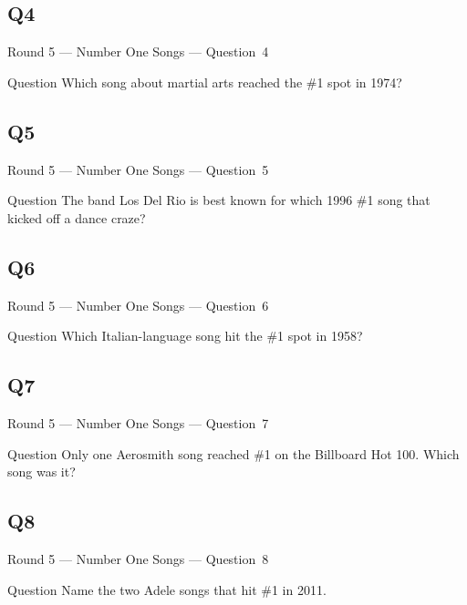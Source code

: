 \documentclass[11pt]{beamer}
\begin{document}
\subsection*{Q4}
\begin{frame}[t]{Round 5 --- Number One Songs --- \mbox{Question 4}}
\vspace{-0.5em}
\begin{block}{Question}
Which song about martial arts reached the \#1 spot in 1974?
\end{block}
\end{frame}
\subsection*{Q5}
\begin{frame}[t]{Round 5 --- Number One Songs --- \mbox{Question 5}}
\vspace{-0.5em}
\begin{block}{Question}
The band Los Del Rio is best known for which 1996 \#1 song that kicked off a dance craze?
\end{block}
\end{frame}
\subsection*{Q6}
\begin{frame}[t]{Round 5 --- Number One Songs --- \mbox{Question 6}}
\vspace{-0.5em}
\begin{block}{Question}
Which Italian-language song hit the \#1 spot in 1958?
\end{block}
\end{frame}
\subsection*{Q7}
\begin{frame}[t]{Round 5 --- Number One Songs --- \mbox{Question 7}}
\vspace{-0.5em}
\begin{block}{Question}
Only one Aerosmith song reached \#1 on the Billboard Hot 100.  Which song was it?
\end{block}
\end{frame}
\subsection*{Q8}
\begin{frame}[t]{Round 5 --- Number One Songs --- \mbox{Question 8}}
\vspace{-0.5em}
\begin{block}{Question}
Name the two Adele songs that hit \#1 in 2011.
\end{block}
\end{frame}
\end{document}
